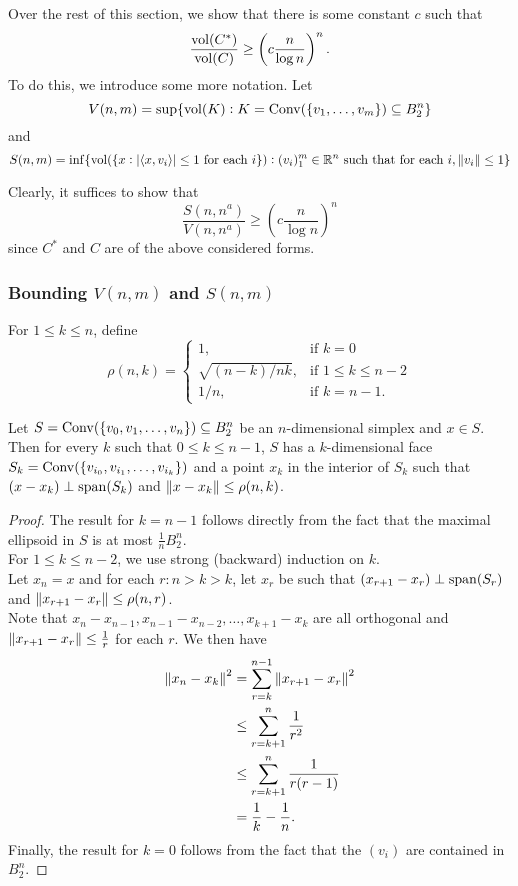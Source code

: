 Over the rest of this section, we show that there is some constant $c$ such that
\[ \frac{\operatorname{vol}(C^*)}{\operatorname{vol}(C)} \geq \left(c \frac{n}{\log n}\right)^n. \]
To do this, we introduce some more notation. Let
\[ V(n,m) = \sup\{\operatorname{vol}(K):K=\operatorname{Conv}(\{v_1,\ldots,v_m\})\subseteq B_2^n\} \]
and
\[ S(n,m) = \inf\{\operatorname{vol}(\{x:|\langle x,v_i\rangle| \leq 1\text{ for each $i$}\}) : (v_i)_1^m\in\mathbb{R}^n\text{ such that for each }i, \left\lVert v_i\right\rVert\leq 1\} \]

Clearly, it suffices to show that
\begin{equation}
\label{eqn: barany furedy}
	\frac{S(n,n^a)}{V(n,n^a)} \geq \left(c \frac{n}{\log n}\right)^n
\end{equation}
since $C^*$ and $C$ are of the above considered forms.\\

\subsubsection{Bounding \texorpdfstring{$V(n,m)$}{V(nm)} and \texorpdfstring{$S(n,m)$}{S(nm)}}

For $1\leq k\leq n$, define
\[
\rho(n,k) = 
\begin{cases}
1, & \text{if }k=0 \\
\sqrt{(n-k)/nk}, & \text{if }1\leq k\leq n-2 \\
1/n, & \text{if }k=n-1.
\end{cases}
\]

\begin{lemma}
\label{rho span bound}
Let $S=\operatorname{Conv}(\{v_0,v_1,\ldots,v_n\})\subseteq B_2^n$ be an $n$-dimensional simplex and $x\in S$. Then for every $k$ such that $0\leq k\leq n-1$, $S$ has a $k$-dimensional face $S_k = \operatorname{Conv}(\{v_{i_0},v_{i_1},\ldots,v_{i_k}\})$ and a point $x_k$ in the interior of $S_k$ such that $(x-x_k) \perp \operatorname{span}(S_k)$ and $\left\lVert x-x_k\right\rVert\leq \rho(n,k)$.
\end{lemma}

\begin{proof}
The result for $k=n-1$ follows directly from the fact that the maximal ellipsoid in $S$ is at most $\frac{1}{n}B_2^n$.\\
For $1\leq k\leq n-2$, we use strong (backward) induction on $k$.\\
Let $x_n=x$ and for each $r:n>k>k$, let $x_r$ be such that $(x_{r+1}-x_r)\perp \operatorname{span}(S_r)$ and $\left\lVert x_{r+1}-x_r\right\rVert \leq \rho(n,r)$.\\
Note that $x_n - x_{n-1}, x_{n-1}-x_{n-2},\ldots,x_{k+1}-x_{k}$ are all orthogonal and $\left\lVert x_{r+1} - x_r\right\rVert\leq\frac{1}{r}$ for each $r$. We then have
\begin{align*}
	\left\lVert x_n - x_k\right\rVert^2 &= \sum_{r=k}^{n-1} \left\lVert x_{r+1}-x_r\right\rVert^2 \\
	&\leq \sum_{r=k+1}^{n} \frac{1}{r^2} \\
	&\leq \sum_{r=k+1}^{n} \frac{1}{r(r-1)} \\
	&= \frac{1}{k} - \frac{1}{n}.
\end{align*}
Finally, the result for $k=0$ follows from the fact that the $(v_i)$ are contained in $B_2^n$.
\end{proof}


